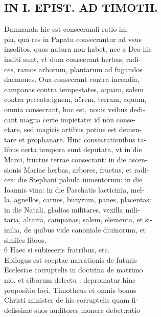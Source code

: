 \documentclass{article}
\begin{document}
\begin{pages}
\section*{IN I. EPIST. AD TIMOTH. \\
                }
Damnanda hic est consecrandi ratio im- \\
                pia, qua res in Papatu consecrantur ad vsus \\
                insolitos, quos natura non habet, nec a Deo his \\
                inditi sunt, vt dum consecrant herbas, radi- \\
                ces, ramos arborum, plantarum ad fugandos \\
                daemones. Oua consecrant contra incendia, \\
                campanas contra tempestates, aquam, salem \\
                contra peccata:ignem, aërem, terram, aquam, \\
                omnia consecrant, hoc est, nouis vsibus dedi- \\
                cant magna certe impietate: id non conse- \\
                ctare, sed magicis artibus potius est demen- \\
                tare et prophanare. Hinc consecrationibus ta- \\
                libus certa tempora sunt deputata, vt in die \\
                Marci, fructus terrae consecrant: in die ascen- \\
                sionis Mariae herbas, arbores, fructus, et radi- \\
                ces: die Stephani pabula iumentorum: in die \\
                Ioannis vina: in die Paschatis lacticinia, mel- \\
                la, agnellos, carnes, butyrum, panes, placentas: \\
                in die Natali, gladios militares, vexilla mili- \\
                taria, altaria, campanas, salem, elementa, et si- \\
                milia, de quibus vide canoniale diuinorum, et \\
                similes libros. \\
                6 Haec si subieceris fratribus, etc. \\
                Epilogus est coeptae narrationis de futuris \\
                Ecclesiae corruptelis in doctrina de matrimo \\
                nio, et ciborum delectu : depromatur hinc \\
                propositio loci, Timotheus et omnis bonus \\
                Christi minister de his corruptelis quam fi- \\
                delissime suos auditores monere debet:ratio \\
                

\end{pages}
\end{document}
